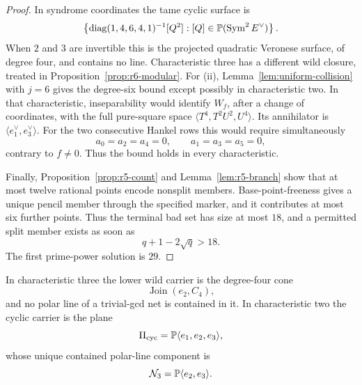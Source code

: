 \begin{proof}
In syndrome coordinates the tame cyclic surface is
\[
\left\{\operatorname{diag}(1,4,6,4,1)^{-1}[Q^2]:
[Q]\in\mathbb P(\operatorname{Sym}^2E^\vee)\right\}.
\]
When $2$ and $3$ are invertible this is the projected quadratic
Veronese surface, of degree four, and contains no line.
Characteristic three has a different
wild closure, treated in Proposition~\ref{prop:r6-modular}.
For (ii), Lemma~\ref{lem:uniform-collision} with \(j=6\) gives the
degree-six bound except possibly in characteristic two.  In that
characteristic, inseparability would identify \(W_f\), after a change
of coordinates, with the full pure-square space
\(\langle T^4,T^2U^2,U^4\rangle\).  Its annihilator is
\(\langle e_1^\vee,e_3^\vee\rangle\).  For the two consecutive Hankel
rows this would require simultaneously
\[
 a_0=a_2=a_4=0,\qquad a_1=a_3=a_5=0,
\]
contrary to \(f\ne0\).  Thus the bound holds in every characteristic.

Finally, Proposition~\ref{prop:r5-count} and Lemma~\ref{lem:r5-branch} show
that at most twelve rational points encode nonsplit members.
Base-point-freeness gives a unique pencil member through the specified marker,
and it contributes at most six further points.  Thus the terminal bad set has
size at most \(18\), and a permitted split member exists as soon as
\[
       q+1-2\sqrt q>18.
\]
The first prime-power solution is $29$.
\end{proof}

\begin{proposition}\label{prop:r6-modular}%
%
%
In characteristic three the lower wild carrier is the degree-four cone
\[
       \operatorname{Join}(e_2,C_4),
\]
and no polar line of a trivial-gcd net is contained in it.  In
characteristic two the cyclic carrier is the plane
\[
       \Pi_{\mathrm{cyc}}=\mathbb P\langle e_1,e_2,e_3\rangle,
\]
whose unique contained polar-line component is
\[
       \mathcal N_3=\mathbb P\langle e_2,e_3\rangle.
\]
\end{proposition}

